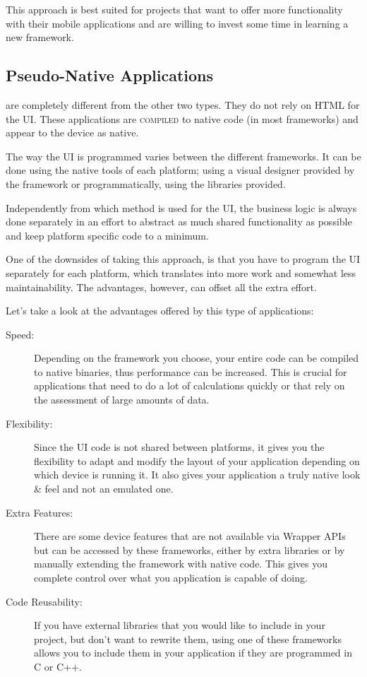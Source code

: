 This approach is best suited for projects that want to offer more functionality with their mobile applications and are willing to invest some time in learning a new framework.  

\subsection{Pseudo-Native Applications}\label{sec:pseudo_app}
 are completely different from the other two types. They do not rely on HTML for the \ac{UI}. These applications are \textsc{compiled} to native code (in most frameworks) and appear to the device as native.


The way the \ac{UI} is programmed varies between the different frameworks. It can be done using the native tools of each platform; using a visual designer provided by the framework or programmatically, using the libraries provided.

Independently from which method is used for the \ac{UI}, the business logic is always done separately in an effort to abstract as much shared functionality as possible and keep platform specific code to a minimum.

One of the downsides of taking this approach, is that you have to program the \ac{UI} separately for each platform, which translates into more work and somewhat less maintainability. The advantages, however, can offset all the extra effort.

Let's take a look at the advantages offered by this type of applications:

\begin{description}

\item[Speed:] Depending on the framework you choose, your entire code can be compiled to native binaries, thus performance can be increased. This is crucial for applications that need to do a lot of calculations quickly or that rely on the assessment of large amounts of data.

\item[Flexibility:] Since the \ac{UI} code is not shared between platforms, it gives you the flexibility to adapt and modify the layout of your application depending on which device is running it. It also gives your application a truly native look \& feel and not an emulated one.

\item[Extra Features:] There are some device features that are not available via Wrapper \ac{API}s but can be accessed by these frameworks, either by extra libraries or by manually extending the framework with native code. This gives you complete control over what you application is capable of doing.
 
\item[Code Reusability:] If you have external libraries that you would like to include in your project, but don't want to rewrite them, using one of these frameworks allows you to include them in your application if they are programmed in C or C++. 

\end{description}


